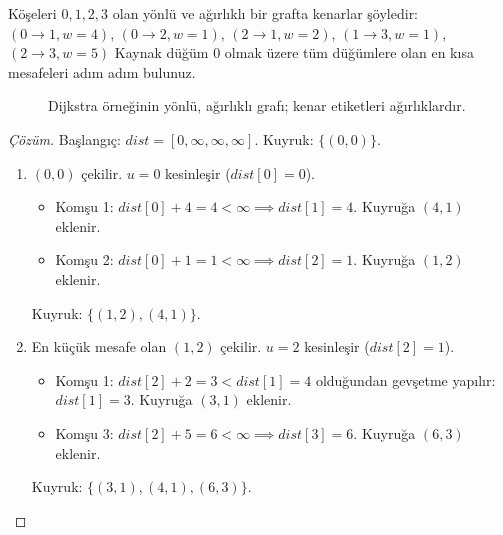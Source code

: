 \begin{example}
Köşeleri $0, 1, 2, 3$ olan yönlü ve ağırlıklı bir grafta kenarlar şöyledir:
$(0 \to 1, w{=}4)$, $(0 \to 2, w{=}1)$, $(2 \to 1, w{=}2)$, $(1 \to 3, w{=}1)$, $(2 \to 3, w{=}5)$
Kaynak düğüm $0$ olmak üzere tüm düğümlere olan en kısa mesafeleri adım adım bulunuz.

\begin{figure}[ht]
\centering
{}
\caption{Dijkstra örneğinin yönlü, ağırlıklı grafı; kenar etiketleri ağırlıklardır.}
\end{figure}

\begin{proof}[Çözüm]
Başlangıç: $dist = [0, \infty, \infty, \infty]$. Kuyruk: $\{(0, 0)\}$.

\begin{enumerate}
    \item $(0, 0)$ çekilir. $u = 0$ kesinleşir ($dist[0] = 0$).
    \begin{itemize}
        \item Komşu 1: $dist[0] + 4 = 4 < \infty \implies dist[1] = 4$. Kuyruğa $(4, 1)$ eklenir.
        \item Komşu 2: $dist[0] + 1 = 1 < \infty \implies dist[2] = 1$. Kuyruğa $(1, 2)$ eklenir.
    \end{itemize}
    Kuyruk: $\{(1, 2), (4, 1)\}$.

    \item En küçük mesafe olan $(1, 2)$ çekilir. $u = 2$ kesinleşir ($dist[2] = 1$).
    \begin{itemize}
        \item Komşu 1: $dist[2] + 2 = 3 < dist[1]=4$ olduğundan gevşetme yapılır: $dist[1] = 3$. Kuyruğa $(3, 1)$ eklenir.
        \item Komşu 3: $dist[2] + 5 = 6 < \infty \implies dist[3] = 6$. Kuyruğa $(6, 3)$ eklenir.
    \end{itemize}
    Kuyruk: $\{(3, 1), (4, 1), (6, 3)\}$.


\end{enumerate}
\end{proof}
\end{example}
